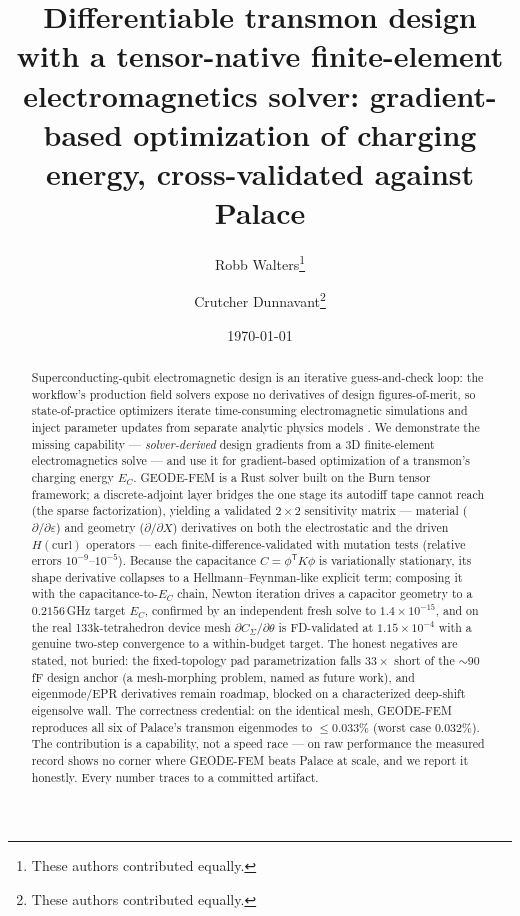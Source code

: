 \documentclass{anvil-paper}
\title{Differentiable transmon design with a tensor-native finite-element
electromagnetics solver: gradient-based optimization of charging energy,
cross-validated against Palace}
\author{Robb Walters\thanks{These authors contributed equally.}
  \and Crutcher Dunnavant\thanks{These authors contributed equally.}}
\date{\today}
\begin{document}
\maketitle

\begin{abstract}
Superconducting-qubit electromagnetic design is an iterative
guess-and-check loop: the workflow's production field solvers expose no
derivatives of design figures-of-merit, so state-of-practice optimizers
iterate time-consuming electromagnetic simulations and inject parameter
updates from separate analytic physics models
\citep{eriksson2025automated}. We demonstrate the missing capability ---
\emph{solver-derived} design gradients from a 3D finite-element
electromagnetics solve --- and use it for gradient-based optimization of a
transmon's charging energy $E_C$. GEODE-FEM is a Rust solver built on the
Burn tensor framework; a discrete-adjoint layer bridges the one stage its
autodiff tape cannot reach (the sparse factorization), yielding a
validated $2\times 2$ sensitivity matrix --- material ($\partial/\partial
\varepsilon$) and geometry ($\partial/\partial X$) derivatives on both the
electrostatic and the driven $H(\mathrm{curl})$ operators --- each
finite-difference-validated with mutation tests (relative errors
$10^{-9}$--$10^{-5}$). Because the capacitance $C = \phi^{\mathsf{T}}
K\phi$ is variationally stationary, its shape derivative collapses to a
Hellmann--Feynman-like explicit term; composing it with the
capacitance-to-$E_C$ chain, Newton iteration drives a capacitor geometry
to a $0.2156$\,GHz target $E_C$, confirmed by an independent fresh solve
to $1.4\times 10^{-15}$, and on the real 133k-tetrahedron device mesh
$\partial C_\Sigma/\partial\theta$ is FD-validated at $1.15\times 10^{-4}$
with a genuine two-step convergence to a within-budget target. The honest
negatives are stated, not buried: the fixed-topology pad parametrization
falls $33\times$ short of the ${\sim}90$\,fF design anchor (a
mesh-morphing problem, named as future work), and eigenmode/EPR
derivatives remain roadmap, blocked on a characterized deep-shift
eigensolve wall. The correctness credential: on the identical mesh,
GEODE-FEM reproduces all six of Palace's transmon eigenmodes to
$\leq 0.033\%$ (worst case $0.032\%$). The contribution is a capability,
not a speed race --- on raw performance the measured record shows no
corner where GEODE-FEM beats Palace at scale, and we report it honestly.
Every number traces to a committed artifact.
\end{abstract}
\end{document}
